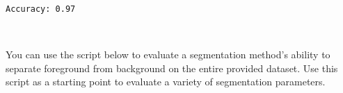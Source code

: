 \documentclass[11pt]{article}
\begin{document}
    \begin{Verbatim}[commandchars=\\\{\}]
Accuracy: 0.97

    \end{Verbatim}

    \begin{center}
    \end{center}
    { \hspace*{\fill} \\}
    
    You can use the script below to evaluate a segmentation method's ability
to separate foreground from background on the entire provided dataset.
Use this script as a starting point to evaluate a variety of
segmentation parameters.
\end{document}
